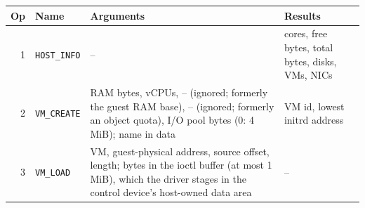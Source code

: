 \documentclass[11pt,a4paper]{report}
\begin{document}
\begin{longtable}{@{}r>{\raggedright\arraybackslash}p{3.6cm}>{\raggedright\arraybackslash}p{4.6cm}>{\raggedright\arraybackslash}p{4.7cm}@{}}
\toprule
Op & Name & Arguments & Results \\
\midrule
\endhead
1 & \texttt{HOST\_INFO} & -- & cores, free bytes, total bytes, disks, VMs,
  NICs \\
2 & \texttt{VM\_CREATE} & RAM bytes, vCPUs, -- (ignored; formerly the
  guest RAM base), -- (ignored; formerly an object quota), I/O pool bytes
  (0: 4 MiB); name in data & VM id, lowest initrd address \\

3 & \texttt{VM\_LOAD} & VM, guest-physical address, source offset, length;
  bytes in the ioctl buffer
  (at most 1 MiB), which the driver stages in the control device's
  host-owned data area & -- \\


\end{longtable}
\end{document}
